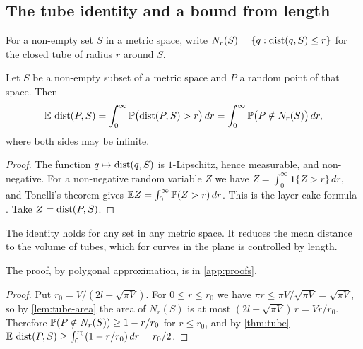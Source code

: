 \subsection{The tube identity and a bound from length}

For a non-empty set $S$ in a metric space, write
$N_r(S)=\{q:\dist(q,S)\le r\}$ for the closed tube of radius $r$ around $S$.

\begin{theorem}\label{thm:tube}
Let $S$ be a non-empty subset of a metric space and $P$ a random point of that
space. Then
\[
  \E\,\dist(P,S)=\int_0^\infty\P\bigl(\dist(P,S)>r\bigr)\,dr
  =\int_0^\infty\P\bigl(P\notin N_r(S)\bigr)\,dr ,
\]
where both sides may be infinite.
\end{theorem}

\begin{proof}
The function $q\mapsto\dist(q,S)$ is $1$-Lipschitz, hence measurable, and
non-negative. For a non-negative random variable $Z$ we have
$Z=\int_0^\infty\mathbf 1\{Z>r\}\,dr$, and Tonelli's theorem gives
$\E Z=\int_0^\infty\P(Z>r)\,dr$. This is the layer-cake formula
\citep[Section~1.13]{lieb2001analysis}. Take $Z=\dist(P,S)$.
\end{proof}

The identity holds for any set in any metric space. It reduces the mean
distance to the volume of tubes, which for curves in the plane is controlled by
length.


The proof, by polygonal approximation, is in \cref{app:proofs}.


\begin{proof}
Put $r_0=V/(2l+\sqrt{\pi V})$. For $0\le r\le r_0$ we have
$\pi r\le\pi V/\sqrt{\pi V}=\sqrt{\pi V}$, so by \cref{lem:tube-area} the area
of $N_r(S)$ is at most $(2l+\sqrt{\pi V})\,r=Vr/r_0$. Therefore
$\P(P\notin N_r(S))\ge1-r/r_0$ for $r\le r_0$, and by \cref{thm:tube}
$\E\,\dist(P,S)\ge\int_0^{r_0}(1-r/r_0)\,dr=r_0/2$.
\end{proof}

